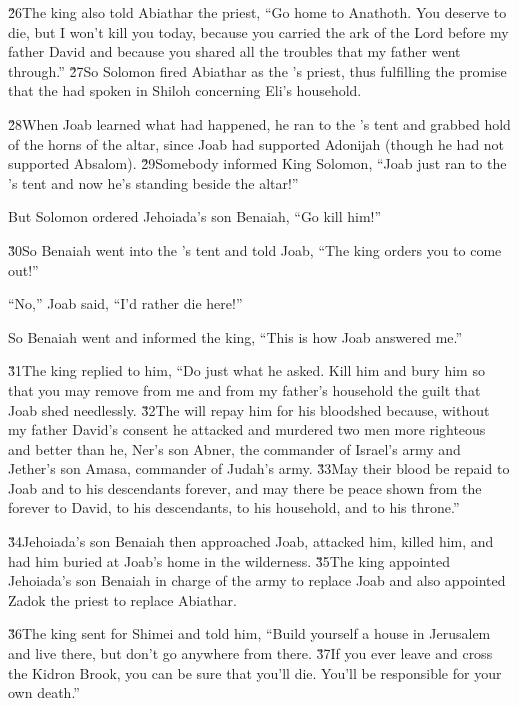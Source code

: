 \v{26}The king also told Abiathar the priest, ``Go home to Anathoth. You deserve to die, but I won't kill you today, because you carried the ark of the Lord  before my father David and because you shared all the troubles that my father went through.'' \v{27}So Solomon fired Abiathar as the 's priest, thus fulfilling the promise that the  had spoken in Shiloh concerning Eli's household.

\v{28}When Joab learned what had happened, he ran to the 's tent and grabbed hold of the horns of the altar, since Joab had supported Adonijah (though he had not supported Absalom). \v{29}Somebody informed King Solomon, ``Joab just ran to the 's tent and now he's standing beside the altar!''

But Solomon ordered Jehoiada's son Benaiah, ``Go kill him!''

\v{30}So Benaiah went into the 's tent and told Joab, ``The king orders you to come out!''

``No,'' Joab said, ``I'd rather die here!''

So Benaiah went and informed the king, ``This is how Joab answered me.''

\v{31}The king replied to him, ``Do just what he asked. Kill him and bury him so that you may remove from me and from my father's household the guilt that Joab shed needlessly. \v{32}The  will repay him for his bloodshed because, without my father David's consent he attacked and murdered two men more righteous and better than he, Ner's son Abner, the commander of Israel's army and Jether's son Amasa, commander of Judah's army. \v{33}May their blood be repaid to Joab and to his descendants forever, and may there be peace shown from the  forever to David, to his descendants, to his household, and to his throne.''

\v{34}Jehoiada's son Benaiah then approached Joab, attacked him, killed him, and had him buried at Joab's home in the wilderness. \v{35}The king appointed Jehoiada's son Benaiah in charge of the army to replace Joab and also appointed Zadok the priest to replace Abiathar.

\v{36}The king sent for Shimei and told him, ``Build yourself a house in Jerusalem and live there, but don't go anywhere from there. \v{37}If you ever leave and cross the Kidron Brook, you can be sure that you'll die. You'll be responsible for your own death.''

